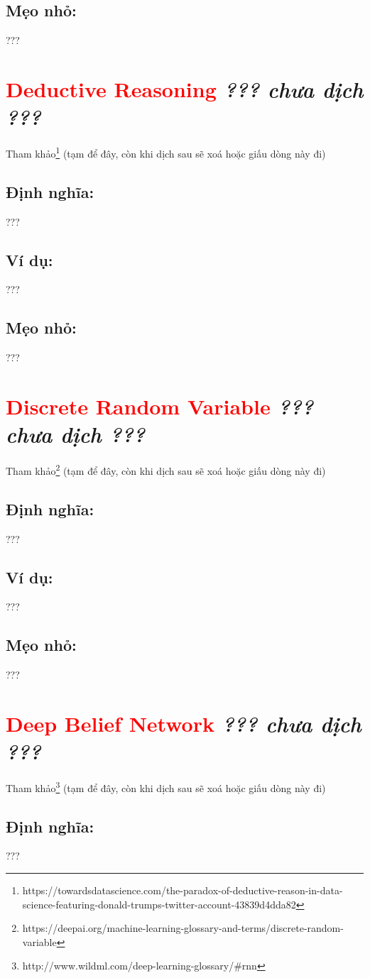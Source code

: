 \subsection*{Mẹo nhỏ:}
???
\section*{\huge \textcolor{Red}{Deductive Reasoning}  \small \textit{??? chưa dịch ???} }
Tham khảo\footnote{https://towardsdatascience.com/the-paradox-of-deductive-reason-in-data-science-featuring-donald-trumps-twitter-account-43839d4dda82} (tạm để đây, còn khi dịch sau sẽ xoá hoặc giấu dòng này đi)
\subsection*{Định nghĩa:}
???
\subsection*{Ví dụ:}
???
\subsection*{Mẹo nhỏ:}
???
\section*{\huge \textcolor{Red}{Discrete Random Variable}  \small \textit{??? chưa dịch ???} }
Tham khảo\footnote{https://deepai.org/machine-learning-glossary-and-terms/discrete-random-variable} (tạm để đây, còn khi dịch sau sẽ xoá hoặc giấu dòng này đi)
\subsection*{Định nghĩa:}
???
\subsection*{Ví dụ:}
???
\subsection*{Mẹo nhỏ:}
???
\section*{\huge \textcolor{Red}{Deep Belief Network}  \small \textit{??? chưa dịch ???} }
Tham khảo\footnote{http://www.wildml.com/deep-learning-glossary/\#rnn} (tạm để đây, còn khi dịch sau sẽ xoá hoặc giấu dòng này đi)
\subsection*{Định nghĩa:}
???

